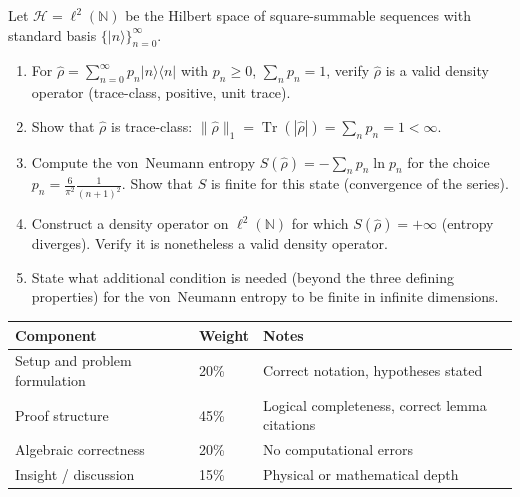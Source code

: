 \documentclass[11pt,a4paper]{article}
\begin{document}
\begin{tcolorbox}[gradprobbox, title={Problem 5 --- Trace-Class Operators and Density Matrices in $\ell^2$ (T5)}]
Let $\mathcal{H}=\ell^2(\mathbb{N})$ be the Hilbert space of square-summable
sequences with standard basis $\{|n\rangle\}_{n=0}^\infty$.

\begin{enumerate}[label=(\alph*), itemsep=8pt]
  \item For $\hat{\rho}=\sum_{n=0}^\infty p_n|n\rangle\langle n|$ with
        $p_n\ge 0$, $\sum_n p_n=1$, verify $\hat{\rho}$ is a valid density operator
        (trace-class, positive, unit trace).
  \item Show that $\hat{\rho}$ is trace-class:
        $\|\hat{\rho}\|_1=\operatorname{Tr}(|\hat{\rho}|)=\sum_n p_n=1<\infty$.
  \item Compute the von~Neumann entropy $S(\hat{\rho})=-\sum_n p_n\ln p_n$
        for the choice $p_n=\frac{6}{\pi^2}\frac{1}{(n+1)^2}$.
        Show that $S$ is finite for this state (convergence of the series).
  \item Construct a density operator on $\ell^2(\mathbb{N})$ for which
        $S(\hat{\rho})=+\infty$ (entropy diverges). Verify it is nonetheless
        a valid density operator.
  \item State what additional condition is needed (beyond the three defining properties)
        for the von~Neumann entropy to be finite in infinite dimensions.
\end{enumerate}
\end{tcolorbox}

\begin{tcolorbox}[rubricbox, title={CPSG Rubric (per problem)}]
\begin{tabular}{lll}
\toprule
Component & Weight & Notes\\
\midrule
Setup and problem formulation & 20\% & Correct notation, hypotheses stated\\
Proof structure               & 45\% & Logical completeness, correct lemma citations\\
Algebraic correctness         & 20\% & No computational errors\\
Insight / discussion          & 15\% & Physical or mathematical depth\\
\bottomrule
\end{tabular}
\end{tcolorbox}
\end{document}
